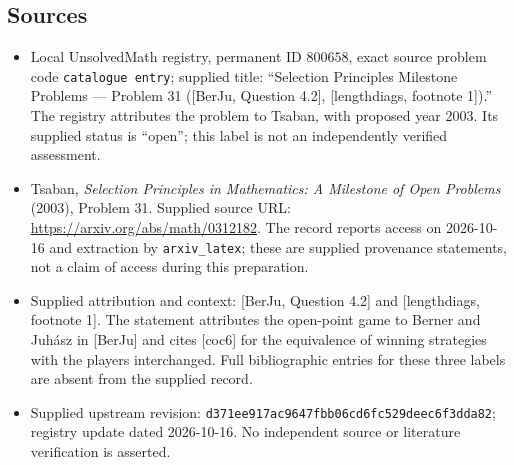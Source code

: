 \documentclass[11pt]{article}
\begin{document}
\subsection{Sources}
\begin{itemize}
\item Local UnsolvedMath registry, permanent ID \(800658\), exact source problem code \texttt{catalogue entry}; supplied title: ``Selection Principles Milestone Problems --- Problem 31 ([BerJu, Question 4.2], [lengthdiags, footnote 1]).'' The registry attributes the problem to Tsaban, with proposed year 2003. Its supplied status is ``open''; this label is not an independently verified assessment.
\item Tsaban, \emph{Selection Principles in Mathematics: A Milestone of Open Problems} (2003), Problem 31. Supplied source URL: \url{https://arxiv.org/abs/math/0312182}. The record reports access on 2026-10-16 and extraction by \texttt{arxiv\_latex}; these are supplied provenance statements, not a claim of access during this preparation.
\item Supplied attribution and context: [BerJu, Question 4.2] and [lengthdiags, footnote 1]. The statement attributes the open-point game to Berner and Juh\'asz in [BerJu] and cites [coc6] for the equivalence of winning strategies with the players interchanged. Full bibliographic entries for these three labels are absent from the supplied record.
\item Supplied upstream revision: \texttt{d371ee917ac9647fbb06cd6fc529deec6f3dda82}; registry update dated 2026-10-16. No independent source or literature verification is asserted.
\end{itemize}
\end{document}
